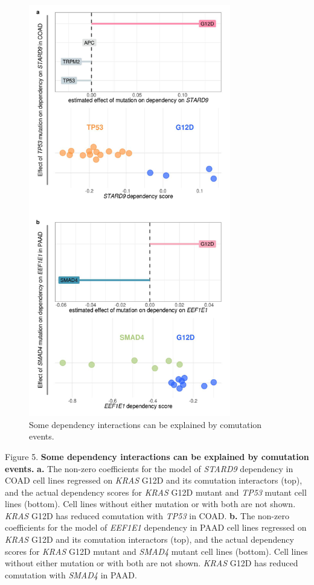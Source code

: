 \documentclass[english, 10pt, letterpaper]{article}
\newcommand{\KRAS}{\emph{KRAS}}
\begin{document}
\begin{figure}[h!]
\centering
\includegraphics[width=88mm]{figures/Fig_5.jpeg}
\caption{Some dependency interactions can be explained by comutation events.}
\label{fig:dep-map-comut-masking}
\end{figure}
\newpage
\noindent Figure 5. \textbf{Some dependency interactions can be explained by comutation events.}
\textbf{a.} The non-zero coefficients for the model of \emph{STARD9} dependency in COAD cell lines regressed on \KRAS{} G12D and its comutation interactors (top), and the actual dependency scores for \KRAS{} G12D mutant and \emph{TP53} mutant cell lines (bottom). Cell lines without either mutation or with both are not shown. \KRAS{} G12D has reduced comutation with \emph{TP53} in COAD.
\textbf{b.} The non-zero coefficients for the model of \emph{EEF1E1} dependency in PAAD cell lines regressed on \KRAS{} G12D and its comutation interactors (top), and the actual dependency scores for \KRAS{} G12D mutant and \emph{SMAD4} mutant cell lines (bottom). Cell lines without either mutation or with both are not shown. \KRAS{} G12D has reduced comutation with \emph{SMAD4} in PAAD.
\newpage
\end{document}
